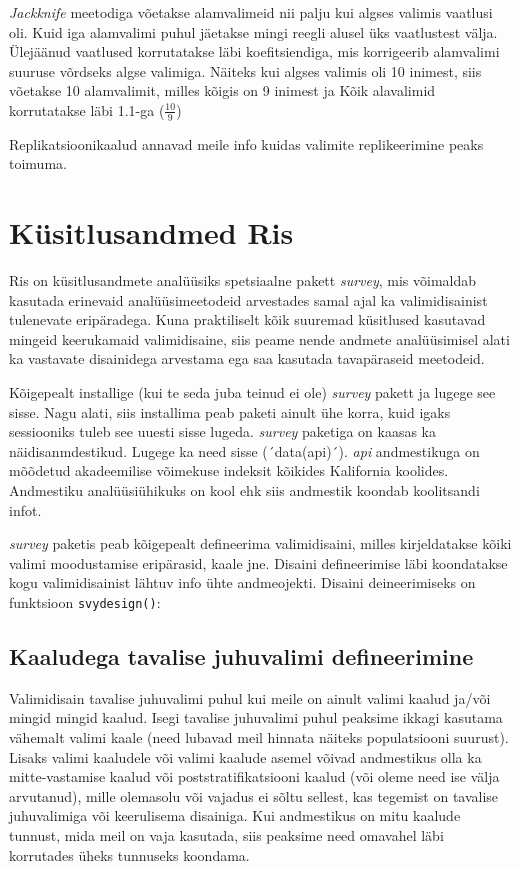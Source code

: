 \documentclass[
]{book}
\begin{document}
\emph{Jackknife} meetodiga võetakse alamvalimeid nii palju kui algses valimis vaatlusi oli. Kuid iga alamvalimi puhul jäetakse mingi reegli alusel üks vaatlustest välja. Ülejäänud vaatlused korrutatakse läbi koefitsiendiga, mis korrigeerib alamvalimi suuruse võrdseks algse valimiga. Näiteks kui algses valimis oli 10 inimest, siis võetakse 10 alamvalimit, milles kõigis on 9 inimest ja Kõik alavalimid korrutatakse läbi 1.1-ga (\(\frac{10}{9}\))

Replikatsioonikaalud annavad meile info kuidas valimite replikeerimine peaks toimuma.

\hypertarget{kuxfcsitlusandmed-ris}{%
\section{Küsitlusandmed Ris}\label{kuxfcsitlusandmed-ris}}

Ris on küsitlusandmete analüüsiks spetsiaalne pakett \emph{survey}, mis võimaldab kasutada erinevaid analüüsimeetodeid arvestades samal ajal ka valimidisainist tulenevate eripäradega. Kuna praktiliselt kõik suuremad küsitlused kasutavad mingeid keerukamaid valimidisaine, siis peame nende andmete analüüsimisel alati ka vastavate disainidega arvestama ega saa kasutada tavapäraseid meetodeid.

Kõigepealt installige (kui te seda juba teinud ei ole) \emph{survey} pakett ja lugege see sisse. Nagu alati, siis installima peab paketi ainult ühe korra, kuid igaks sessiooniks tuleb see uuesti sisse lugeda. \emph{survey} paketiga on kaasas ka näidisanmdestikud. Lugege ka need sisse (´data(api)´). \emph{api} andmestikuga on mõõdetud akadeemilise võimekuse indeksit kõikides Kalifornia koolides. Andmestiku analüüsiühikuks on kool ehk siis andmestik koondab koolitsandi infot.

\emph{survey} paketis peab kõigepealt defineerima valimidisaini, milles kirjeldatakse kõiki valimi moodustamise eripärasid, kaale jne. Disaini defineerimise läbi koondatakse kogu valimidisainist lähtuv info ühte andmeojekti. Disaini deineerimiseks on funktsioon \texttt{svydesign()}:

\hypertarget{kaaludega-tavalise-juhuvalimi-defineerimine}{%
\subsection{Kaaludega tavalise juhuvalimi defineerimine}\label{kaaludega-tavalise-juhuvalimi-defineerimine}}

Valimidisain tavalise juhuvalimi puhul kui meile on ainult valimi kaalud ja/või mingid mingid kaalud. Isegi tavalise juhuvalimi puhul peaksime ikkagi kasutama vähemalt valimi kaale (need lubavad meil hinnata näiteks populatsiooni suurust). Lisaks valimi kaaludele või valimi kaalude asemel võivad andmestikus olla ka mitte-vastamise kaalud või poststratifikatsiooni kaalud (või oleme need ise välja arvutanud), mille olemasolu või vajadus ei sõltu sellest, kas tegemist on tavalise juhuvalimiga või keerulisema disainiga. Kui andmestikus on mitu kaalude tunnust, mida meil on vaja kasutada, siis peaksime need omavahel läbi korrutades üheks tunnuseks koondama.
\end{document}
